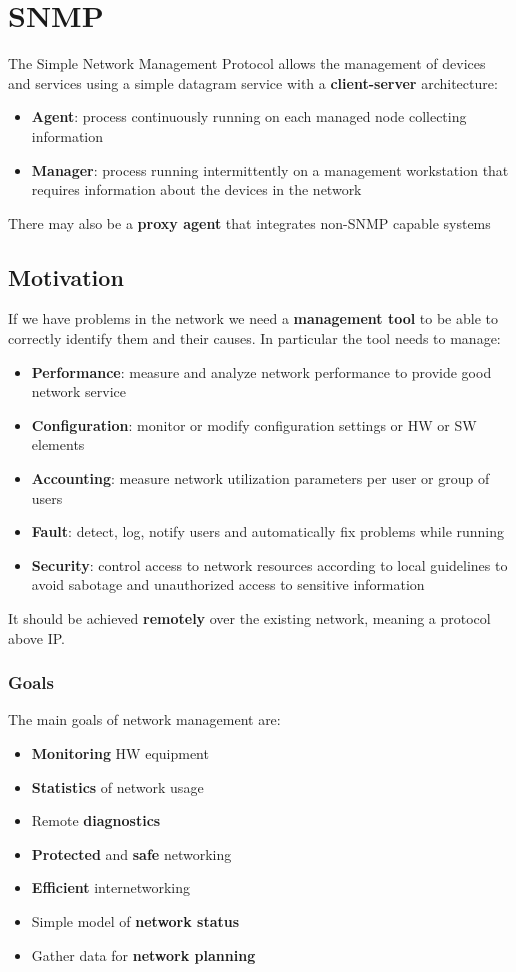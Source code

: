 \newpage
\section{SNMP}
The Simple Network Management Protocol allows the management of devices and services using a simple datagram service with a \textbf{client-server} architecture:
\begin{itemize}
	\item \textbf{Agent}: process continuously running on each managed node collecting information
	\item \textbf{Manager}: process running intermittently on a management workstation that requires information about the devices in the network
\end{itemize}
There may also be a \textbf{proxy agent} that integrates non-SNMP capable systems
\subsection{Motivation}
If we have problems in the network we need a \textbf{management tool} to be able to correctly identify them and their causes. In particular the tool needs to manage:
\begin{itemize}
	\item \textbf{Performance}: measure and analyze network performance to provide good network service
	\item \textbf{Configuration}: monitor or modify configuration settings or HW or SW elements
	\item \textbf{Accounting}: measure network utilization parameters per user or group of users
	\item \textbf{Fault}: detect, log, notify users and automatically fix problems while running
	\item \textbf{Security}: control access to network resources according to local guidelines to avoid sabotage and unauthorized access to sensitive information
\end{itemize}

\begin{observation}
	It should be achieved \textbf{remotely} over the existing network, meaning a protocol above IP.
\end{observation}

\subsubsection{Goals}
The main goals of network management are:
\begin{itemize}
	\item \textbf{Monitoring} HW equipment
	\item \textbf{Statistics} of network usage
	\item Remote \textbf{diagnostics}
	\item \textbf{Protected} and \textbf{safe} networking
	\item \textbf{Efficient} internetworking
	\item Simple model of \textbf{network status}
	\item Gather data for \textbf{network planning}
\end{itemize}


